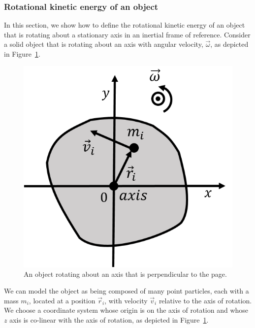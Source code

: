 \subsubsection{Rotational kinetic energy of an object}

In this section, we show how to define the rotational kinetic energy of an object that is rotating about a stationary axis in an inertial frame of reference. Consider a solid object that is rotating about an axis with angular velocity, $\vec\omega$, as depicted in Figure~\ref{fig:angularmomentumrolling:rotE}.

\begin{figure}[!htbp]
\centering
\includegraphics[width=0.4\linewidth]{files/rotE-3c26b1af2248a765fa579be7b104af95.png}
\caption[]{An object rotating about an axis that is perpendicular to the page.}
\label{fig:angularmomentumrolling:rotE}
\end{figure}

We can model the object as being composed of many point particles, each with a mass $m_i$, located at a position $\vec r_i$, with velocity $\vec v_i$ relative to the axis of rotation. We choose a coordinate system whose origin is on the axis of rotation and whose $z$ axis is co-linear with the axis of rotation, as depicted in Figure~\ref{fig:angularmomentumrolling:rotE}.

